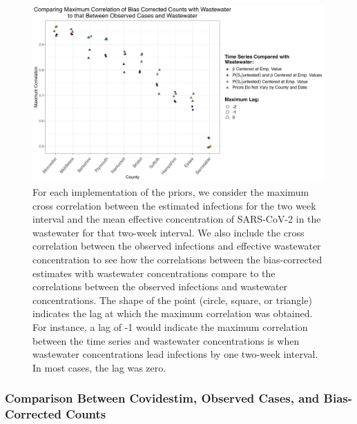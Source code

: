 \documentclass[12pt,twoside]{smiththesis}
\begin{document}
~

~

~

~

~

~

~

~
\begin{figure}
\includegraphics[width=1\linewidth]{figure/correlation_observed_pb} \caption{\label{fig:correlation_observed_pb}For each implementation of the priors, we consider the maximum cross correlation between the estimated infections for the two week interval and the mean effective concentration of SARS-CoV-2 in the wastewater for that two-week interval. We also include the cross correlation between the observed infections and effective wastewater concentration to see how the correlations between the bias-corrected estimates with wastewater concentrations compare to the correlations between the observed infections and wastewater concentrations. The shape of the point (circle, square, or triangle) indicates the lag at which the maximum correlation was obtained. For instance, a lag of -1 would indicate the maximum correlation between the time series and wastewater concentrations is when wastewater concentrations lead infections by one two-week interval. In most cases, the lag was zero.}\label{fig:unnamed-chunk-91}
\end{figure}
\hypertarget{comparison-between-covidestim-observed-cases-and-bias-corrected-counts}{%
\subsubsection{Comparison Between Covidestim, Observed Cases, and Bias-Corrected Counts}\label{comparison-between-covidestim-observed-cases-and-bias-corrected-counts}}
\end{document}
